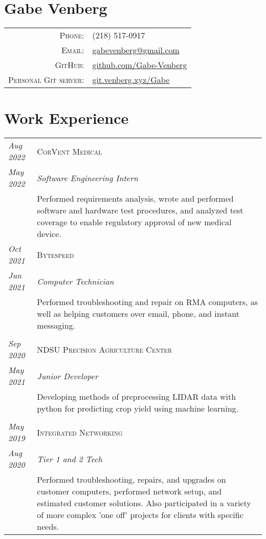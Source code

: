 \documentclass[letterpaper,10pt]{article}
\begin{document}
\pagestyle{empty}%
\section*{Gabe Venberg}
	\begin{tabular}{rl}
	\textsc{Phone:} & (218) 517-0917\\
	\textsc{Email:} & \href{mailto:gabevenberg@gmail.com}{gabevenberg@gmail.com}\\
	\textsc{GitHub:} & \href{https://github.com/Gabe-Venberg}{github.com/Gabe-Venberg}\\
	\textsc{Personal Git server:} & \href{https://git.venberg.xyz/Gabe}{git.venberg.xyz/Gabe}\\
	\end{tabular}
\section*{Work Experience}
	\begin{tabular}{R{2cm}|p{14cm}}
	\textsl{Aug 2022}	&\textsc{CorVent Medical}\\
	\textsl{May 2022}	&\emph{Software Engineering Intern}\\
	& Performed requirements analysis, wrote and performed software and hardware test procedures, and analyzed test coverage to enable regulatory approval of new medical device.\\
	\textsl{Oct 2021}	& \textsc{Bytespeed}\\
	\textsl{Jun 2021}	& \emph{Computer Technician}\\
	& Performed troubleshooting and repair on RMA computers, as well as helping customers over email, phone, and instant messaging.\\
	\\
	\textsl{Sep 2020}	& \textsc{NDSU Precision Agriculture Center}\\
	\textsl{May 2021}	& \emph{Junior Developer}\\
	& Developing methods of preprocessing LIDAR data with python for predicting crop yield using machine learning.\\
	\\
	\textsl{May 2019}	& \textsc{Integrated Networking}\\
	\textsl{Aug 2020}	& \emph{Tier 1 and 2 Tech}\\
	& Performed troubleshooting, repairs, and upgrades on customer computers, performed network setup, and estimated customer solutions.
	Also participated in a variety of more complex 'one off' projects for clients with specific needs.\\
	\end{tabular}
\end{document}
